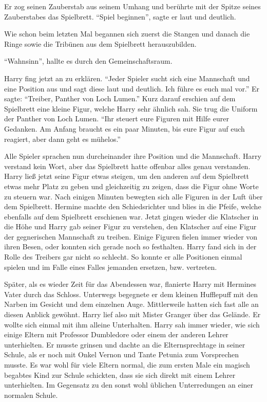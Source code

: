 Er zog seinen Zauberstab aus seinem Umhang und berührte mit der Spitze seines Zauberstabes das Spielbrett. \enquote{Spiel beginnen}, sagte er laut und deutlich.

Wie schon beim letzten Mal begannen sich zuerst die Stangen und danach die Ringe sowie die Tribünen aus dem Spielbrett herauszubilden.

\enquote{Wahnsinn}, hallte es durch den Gemeinschaftsraum.

Harry fing jetzt an zu erklären. \enquote{Jeder Spieler sucht sich eine Mannschaft und eine Position aus und sagt diese laut und deutlich. Ich führe es euch mal vor.} Er sagte: \enquote{Treiber, Panther von Loch Lumen.} Kurz darauf erschien auf dem Spielbrett eine kleine Figur, welche Harry sehr ähnlich sah. Sie trug die Uniform der Panther von Loch Lumen. \enquote{Ihr steuert eure Figuren mit Hilfe eurer Gedanken. Am Anfang braucht es ein paar Minuten, bis eure Figur auf euch reagiert, aber dann geht es mühelos.}

Alle Spieler sprachen nun durcheinander ihre Position und die Mannschaft. Harry verstand kein Wort, aber das Spielbrett hatte offenbar alles genau verstanden. Harry ließ jetzt seine Figur etwas steigen, um den anderen auf dem Spielbrett etwas mehr Platz zu geben und gleichzeitig zu zeigen, dass die Figur ohne Worte zu steuern war. Nach einigen Minuten bewegten sich alle Figuren in der Luft über dem Spielbrett. Hermine machte den Schiedsrichter und blies in die Pfeife, welche ebenfalls auf dem Spielbrett erschienen war. Jetzt gingen wieder die Klatscher in die Höhe und Harry gab seiner Figur zu verstehen, den Klatscher auf eine Figur der gegnerischen Mannschaft zu treiben. Einige Figuren fielen immer wieder von ihren Besen, oder konnten sich gerade noch so festhalten. Harry fand sich in der Rolle des Treibers gar nicht so schlecht. So konnte er alle Positionen einmal spielen und im Falle eines Falles jemanden ersetzen, bzw. vertreten.

Später, als es wieder Zeit für das Abendessen war, flanierte Harry mit Hermines Vater durch das Schloss. Unterwegs begegnete er dem kleinen Hufflepuff mit den Narben im Gesicht und dem einzelnen Auge. Mittlerweile hatten sich fast alle an diesen Anblick gewöhnt. Harry lief also mit  Mister Granger über das Gelände. Er wollte sich einmal mit ihm alleine Unterhalten. Harry sah immer wieder, wie sich einige Eltern mit Professor Dumbledore oder einem der anderen Lehrer unterhielten. Er musste grinsen und dachte an die Elternsprechtage in seiner Schule, als er noch mit Onkel Vernon und Tante Petunia zum Vorsprechen musste. Es war wohl für viele Eltern normal, die zum ersten Male ein magisch begabtes Kind zur Schule schickten, dass sie sich direkt mit einem Lehrer unterhielten. Im Gegensatz zu den sonst wohl üblichen Unterredungen an einer normalen Schule.

